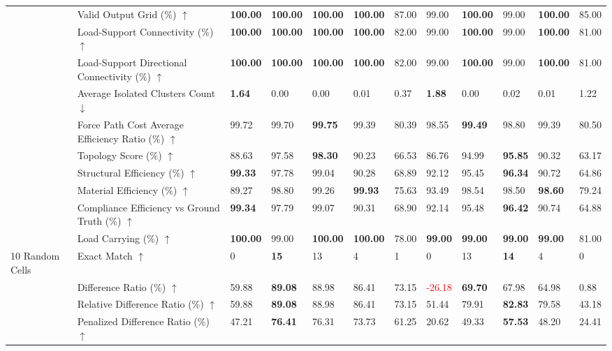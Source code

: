 \begin{table}[!h]
{\begin{tabular}{lllllll|lllll}
 & Valid Output Grid (\%) $\uparrow$ & \textbf{100.00} & \textbf{100.00} & \textbf{100.00} & \textbf{100.00} & 87.00 & 99.00 & \textbf{100.00} & 99.00 & \textbf{100.00} & 85.00 \\
 & Load-Support Connectivity (\%) $\uparrow$ & \textbf{100.00} & \textbf{100.00} & \textbf{100.00} & \textbf{100.00} & 82.00 & 99.00 & \textbf{100.00} & 99.00 & \textbf{100.00} & 81.00 \\
 & Load-Support Directional Connectivity (\%) $\uparrow$ & \textbf{100.00} & \textbf{100.00} & \textbf{100.00} & \textbf{100.00} & 82.00 & 99.00 & \textbf{100.00} & 99.00 & \textbf{100.00} & 81.00 \\
 & Average Isolated Clusters Count $\downarrow$ & \textbf{1.64} & 0.00 & 0.00 & 0.01 & 0.37 & \textbf{1.88} & 0.00 & 0.02 & 0.01 & 1.22 \\
 & Force Path Cost Average Efficiency Ratio (\%) $\uparrow$ & 99.72 & 99.70 & \textbf{99.75} & 99.39 & 80.39 & 98.55 & \textbf{99.49} & 98.80 & 99.39 & 80.50 \\
 & Topology Score (\%) $\uparrow$ & 88.63 & 97.58 & \textbf{98.30} & 90.23 & 66.53 & 86.76 & 94.99 & \textbf{95.85} & 90.32 & 63.17 \\
 & Structural Efficiency (\%) $\uparrow$ & \textbf{99.33} & 97.78 & 99.04 & 90.28 & 68.89 & 92.12 & 95.45 & \textbf{96.34} & 90.72 & 64.86 \\
 & Material Efficiency (\%) $\uparrow$ & 89.27 & 98.80 & 99.26 & \textbf{99.93} & 75.63 & 93.49 & 98.54 & 98.50 & \textbf{98.60} & 79.24 \\
 & Compliance Efficiency vs Ground Truth (\%) $\uparrow$ & \textbf{99.34} & 97.79 & 99.07 & 90.31 & 68.90 & 92.14 & 95.48 & \textbf{96.42} & 90.74 & 64.88 \\
 & Load Carrying (\%) $\uparrow$ & \textbf{100.00} & 99.00 & \textbf{100.00} & \textbf{100.00} & 78.00 & \textbf{99.00} & \textbf{99.00} & \textbf{99.00} & \textbf{99.00} & 81.00 \\
\midrule
10 Random Cells & Exact Match $\uparrow$ & 0 & \textbf{15} & 13 & 4 & 1 & 0 & 13 & \textbf{14} & 4 & 0 \\
 & Difference Ratio (\%) $\uparrow$ & 59.88 & \textbf{89.08} & 88.98 & 86.41 & 73.15 & \textcolor{red}{-26.18} & \textbf{69.70} & 67.98 & 64.98 & 0.88 \\
 & Relative Difference Ratio (\%) $\uparrow$ & 59.88 & \textbf{89.08} & 88.98 & 86.41 & 73.15 & 51.44 & 79.91 & \textbf{82.83} & 79.58 & 43.18 \\
 & Penalized Difference Ratio (\%) $\uparrow$ & 47.21 & \textbf{76.41} & 76.31 & 73.73 & 61.25 & 20.62 & 49.33 & \textbf{57.53} & 48.20 & 24.41 \\

\end{tabular}}
\end{table}
